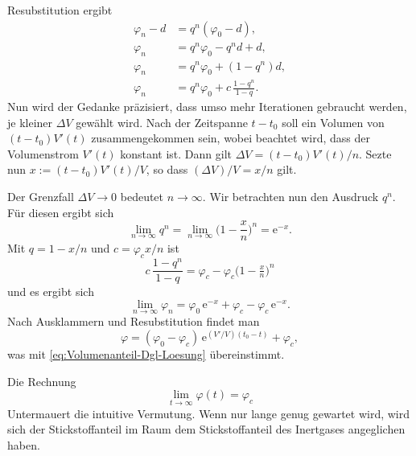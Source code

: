 \documentclass[a4paper,11pt,fleqn,twocolumn,twoside,dvipdfmx]{scrartcl}
\numberwithin{equation}{section}
\newcommand{\ee}{\mathrm e}
\begin{document}
Resubstitution ergibt
\begin{align}
\varphi_n-d &= q^n (\varphi_0-d),\\
\varphi_n &= q^n\varphi_0-q^n d+d,\\
\varphi_n &= q^n\varphi_0+(1-q^n)d,\\
\varphi_n &= q^n\varphi_0+c\,\frac{1-q^n}{1-q}.
\end{align}
Nun wird der Gedanke präzisiert, dass umso mehr Iterationen
gebraucht werden, je kleiner $\Delta V$ gewählt wird.
Nach der Zeitspanne $t-t_0$ soll ein Volumen von $(t-t_0)V'(t)$
zusammengekommen sein, wobei beachtet wird, dass der Volumenstrom
$V'(t)$ konstant ist. Dann gilt $\Delta V = (t-t_0)V'(t)/n$.
Sezte nun $x:=(t-t_0)V'(t)/V$, so dass $(\Delta V)/V=x/n$ gilt.
 
Der Grenzfall $\Delta V\to 0$ bedeutet $n\to\infty$.
Wir betrachten nun den Ausdruck $q^n$. Für diesen ergibt sich%
\begin{equation}
\lim_{n\to\infty} q^n = \lim_{n\to\infty} \Big(1-\frac{x}{n}\Big)^n
= \ee^{-x}.
\end{equation}
Mit $q=1-x/n$ und $c=\varphi_c x/n$ ist
\begin{equation}
c\,\frac{1-q^n}{1-q}
= \varphi_c -\varphi_c\big(1-\tfrac{x}{n}\big)^n
\end{equation}
und es ergibt sich
\begin{equation}
\lim_{n\to\infty}\varphi_n = \varphi_0\,\ee^{-x}+\varphi_c-\varphi_c\,\ee^{-x}.
\end{equation}
Nach Ausklammern und Resubstitution findet man
\begin{equation}
\varphi = (\varphi_0-\varphi_c)\,\ee^{(V'/V)(t_0-t)}+\varphi_c,
\end{equation}
was mit \eqref{eq:Volumenanteil-Dgl-Loesung} übereinstimmt.

Die Rechnung
\begin{equation}
\lim_{t\to\infty}\varphi(t) = \varphi_c
\end{equation}
Untermauert die intuitive Vermutung. Wenn nur lange genug gewartet
wird, wird sich der Stickstoffanteil im Raum dem Stickstoffanteil des
Inertgases angeglichen haben.
\end{document}
